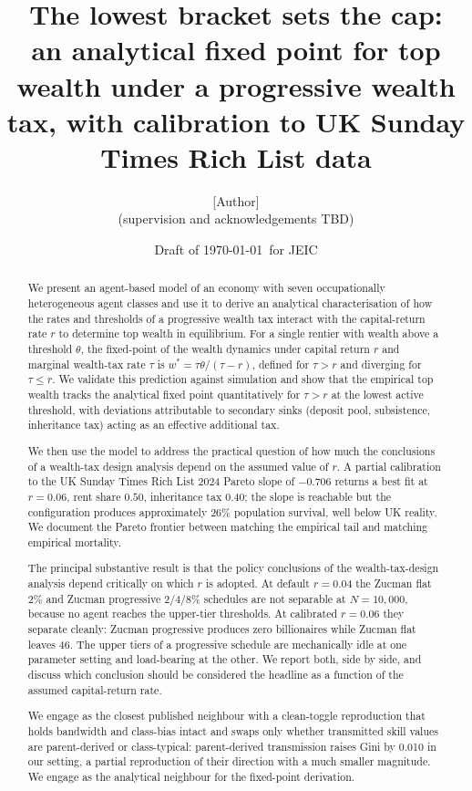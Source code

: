 \documentclass[11pt]{article}
\title{The lowest bracket sets the cap:\\
\large an analytical fixed point for top wealth under a progressive
wealth tax, with calibration to UK Sunday Times Rich List data}
\author{[Author]\\
\small (supervision and acknowledgements TBD)}
\date{Draft of \today\ for JEIC}
\begin{document}
\maketitle

\begin{abstract}
We present an agent-based model of an economy with seven occupationally
heterogeneous agent classes and use it to derive an analytical
characterisation of how the rates and thresholds of a progressive
wealth tax interact with the capital-return rate $r$ to determine
top wealth in equilibrium.  For a single rentier with wealth above a
threshold $\theta$, the fixed-point of the wealth dynamics under
capital return $r$ and marginal wealth-tax rate $\tau$ is
$w^* = \tau \theta / (\tau - r)$, defined for $\tau > r$ and
diverging for $\tau \leq r$.  We validate this prediction against
simulation and show that the empirical top wealth tracks the
analytical fixed point quantitatively for $\tau > r$ at the lowest
active threshold, with deviations attributable to secondary sinks
(deposit pool, subsistence, inheritance tax) acting as an effective
additional tax.

We then use the model to address the practical question of how
much the conclusions of a wealth-tax design analysis depend on the
assumed value of $r$.  A partial calibration to the UK Sunday Times
Rich List 2024 Pareto slope of $-0.706$ returns a best fit at
$r = 0.06$, rent share $0.50$, inheritance tax $0.40$; the slope is
reachable but the configuration produces approximately 26\% population
survival, well below UK reality.  We document the Pareto frontier
between matching the empirical tail and matching empirical mortality.

The principal substantive result is that the policy conclusions of
the wealth-tax-design analysis depend critically on which $r$ is
adopted.  At default $r = 0.04$ the Zucman flat 2\% and Zucman
progressive 2/4/8\% schedules are not separable at $N = 10{,}000$,
because no agent reaches the upper-tier thresholds.  At calibrated
$r = 0.06$ they separate cleanly: Zucman progressive produces zero
billionaires while Zucman flat leaves 46.  The upper tiers of a
progressive schedule are mechanically idle at one parameter setting
and load-bearing at the other.  We report both, side by side, and
discuss which conclusion should be considered the headline as a
function of the assumed capital-return rate.

We engage \citet{spangler2022distribution} as the closest published
neighbour with a clean-toggle reproduction that holds bandwidth and
class-bias intact and swaps only whether transmitted skill values
are parent-derived or class-typical: parent-derived transmission
raises Gini by 0.010 in our setting, a partial reproduction of
their direction with a much smaller magnitude.  We engage
\citet{benhabib2011distribution} as the analytical neighbour for the
fixed-point derivation.


\end{abstract}
\end{document}
